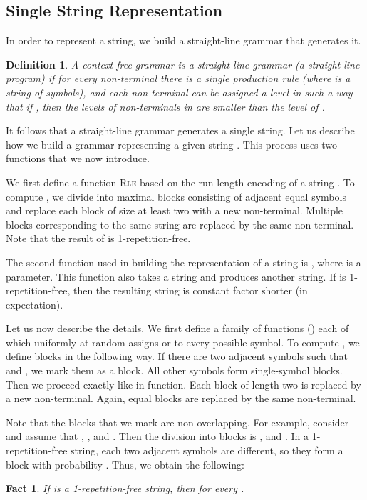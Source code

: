 \documentclass[a4paper]{article}
\newtheorem{fact}[theorem]{Fact}
\newtheorem{definition}[theorem]{Definition}
\theoremstyle{remark}
\newcommand{\rle}{\textsc{Rle}}
\begin{document}
\subsection{Single String Representation}\label{sec:single_string}
In order to represent a string, we build a straight-line grammar that generates it.
\begin{definition}
A context-free grammar is a \emph{straight-line grammar} (a straight-line program) if for every non-terminal 
there is a single production rule  (where  is a string of symbols),
and each non-terminal can be assigned a level in such a way that if , then the levels of non-terminals in  are smaller than the level of .
\end{definition}
It follows that a straight-line grammar generates a single string.
Let us describe how we build a grammar representing a given string .
This process uses two functions that we now introduce.

We first define a function \rle{} based on the run-length encoding of a string .
To compute , we divide  into maximal blocks consisting of adjacent equal symbols and replace each block of size at least two with a new non-terminal. Multiple blocks corresponding to the same string are replaced by the same non-terminal.
Note that the result of  is 1-repetition-free.

The second function used in building the representation of a string is , where  is a parameter.
This function also takes a string  and produces another string.
If  is 1-repetition-free, then the resulting string is constant factor shorter (in expectation).

Let us now describe the details.
We first define a family of functions  () each of which uniformly at random assigns  or  to every possible symbol.
To compute , we define blocks in the following way.
If there are two adjacent symbols  such that  and , we mark them as a block.
All other symbols form single-symbol blocks.
Then we proceed exactly like in  function.
Each block of length two is replaced by a new non-terminal.
Again, equal blocks are replaced by the same non-terminal.

Note that the blocks that we mark are non-overlapping.
For example, consider  and assume that , , and .
Then the division into blocks is , and .
In a 1-repetition-free string, each two adjacent symbols are different, so they form a block with probability .
Thus, we obtain the following:
\begin{fact}\label{lem:compress}
If  is a 1-repetition-free string, then  for every .
\end{fact}
\end{document}
